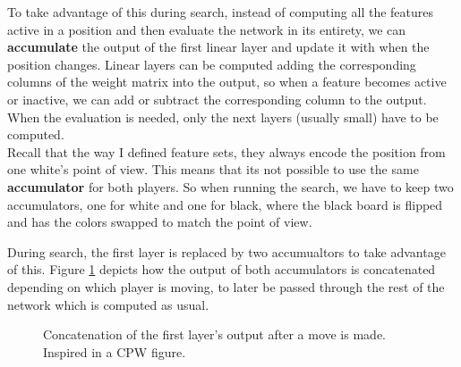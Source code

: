 To take advantage of this during search, instead of computing all the features active in a position and then evaluate the network in its entirety, we can \textbf{accumulate} the output of the first linear layer and update it with when the position changes. Linear layers can be computed adding the corresponding columns of the weight matrix into the output, so when a feature becomes active or inactive, we can add or subtract the corresponding column to the output. When the evaluation is needed, only the next layers (usually small) have to be computed. \\

Recall that the way I defined feature sets, they always encode the position from one white's point of view. This means that its not possible to use the same \textbf{accumulator} for both players. So when running the search, we have to keep two accumulators, one for white and one for black, where the black board is flipped and has the colors swapped to match the point of view.


%
%
%
%
%
%
%
%
%
%
%
%
%
%
%
%
%
%
%
%
%


During search, the first layer is replaced by two accumualtors to take advantage of this. Figure \ref{fig:incr_update} depicts how the output of both accumulators is concatenated depending on which player is moving, to later be passed through the rest of the network which is computed as usual. 

\begin{figure}[H]
\centering
{}
\caption{Concatenation of the first layer's output after a move is made. Inspired in a CPW figure.}
\label{fig:incr_update}
\end{figure}

